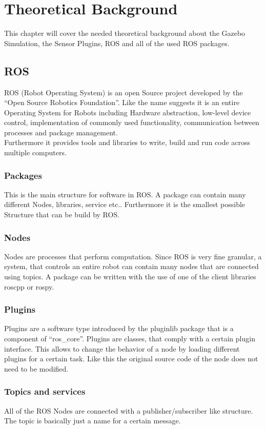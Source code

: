 \chapter{Theoretical Background}
\label{theoretical_background}
This chapter will cover the needed theoretical background about the Gazebo Simulation, the Sensor Plugins, ROS and all of the used ROS packages.

\section{ROS}
ROS (Robot Operating System) is an open Source project developed by the ``Open Source Robotics Foundation''. Like the name suggests it is an entire Operating System for Robots including Hardware abstraction, low-level device control, implementation of commonly used functionality, communication between processes and package management.\\
Furthermore it provides tools and libraries to write, build and run code across multiple computers\cite{rosintro}.\\
\subsection{Packages}
This is the main structure for software in ROS. A package can contain many different Nodes, libraries, service etc.. Furthermore it is the smallest possible Structure that can be build by ROS\cite{rosconcepts}.
\subsection{Nodes}
Nodes are processes that perform computation. Since ROS is very fine granular, a system, that controls an entire robot can contain many nodes that are connected using topics. A package can be written with the use of one of the client libraries roscpp or rospy\cite{rosconcepts}.
\subsection{Plugins}

Plugins are a software type introduced by the pluginlib package that is a component of ``ros\_core''. Plugins are classes, that comply with a certain plugin interface. This allows to change the behavior of a node by loading different plugins for a certain task. Like this the original source code of the node does not need to be modified\cite{pluginlib}.

\subsection{Topics and services}
All of the ROS Nodes are connected with a publisher/subscriber like structure. The topic is basically just a name for a certain message.\\

